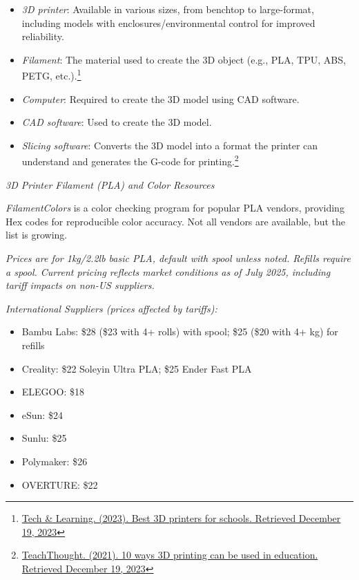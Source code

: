 \begin{itemize}
    \item \emph{3D printer}: Available in various sizes, from benchtop to large-format, including models with enclosures/environmental control for improved reliability.
    \item \emph{Filament}: The material used to create the 3D object (e.g., PLA, TPU, ABS, PETG, etc.).\footnote{\href{http://www.techlearning.com/buying-guides/best-3d-printers-for-schools}{Tech \& Learning. (2023). Best 3D printers for schools. Retrieved December 19, 2023}}
    \item \emph{Computer}: Required to create the 3D model using CAD software.
    \item \emph{CAD software}: Used to create the 3D model.
    \item \emph{Slicing software}: Converts the 3D model into a format the printer can understand and generates the G-code for printing.\footnote{\href{http://www.teachthought.com/technology/ways-3d-printing-can-be-used-in-education/}{TeachThought. (2021). 10 ways 3D printing can be used in education. Retrieved December 19, 2023}}
\end{itemize}

\emph{3D Printer Filament (PLA) and Color Resources}

\emph{FilamentColors} is a color checking program for popular PLA vendors, providing Hex codes for reproducible color accuracy. Not all vendors are available, but the list is growing.

\textit{Prices are for 1kg/2.2lb basic PLA, default with spool unless noted. Refills require a spool. Current pricing reflects market conditions as of July 2025, including tariff impacts on non-US suppliers.}

\emph{International Suppliers (prices affected by tariffs):}
\begin{itemize}
    \item Bambu Labs: \$28 (\$23 with 4+ rolls) with spool; \$25 (\$20 with 4+ kg) for refills
    \item Creality: \$22 Soleyin Ultra PLA; \$25 Ender Fast PLA
    \item ELEGOO: \$18
    \item eSun: \$24
    \item Sunlu: \$25
    \item Polymaker: \$26
    \item OVERTURE: \$22
\end{itemize}

